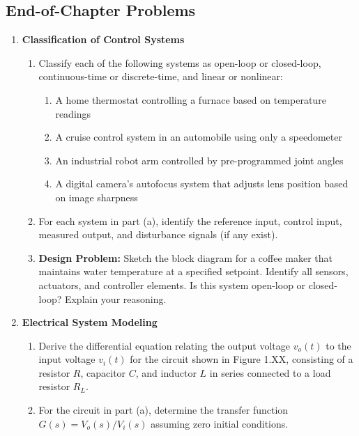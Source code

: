 \subsection{End-of-Chapter Problems}

\begin{enumerate}

\item \textbf{Classification of Control Systems}
\begin{enumerate}
\item Classify each of the following systems as open-loop or closed-loop, continuous-time or discrete-time, and linear or nonlinear:
\begin{enumerate}
\item A home thermostat controlling a furnace based on temperature readings
\item A cruise control system in an automobile using only a speedometer
\item An industrial robot arm controlled by pre-programmed joint angles
\item A digital camera's autofocus system that adjusts lens position based on image sharpness
\end{enumerate}
\item For each system in part (a), identify the reference input, control input, measured output, and disturbance signals (if any exist).

\item \textbf{Design Problem:} Sketch the block diagram for a coffee maker that maintains water temperature at a specified setpoint. Identify all sensors, actuators, and controller elements. Is this system open-loop or closed-loop? Explain your reasoning.

\end{enumerate}

\item \textbf{Electrical System Modeling}
\begin{enumerate}
\item Derive the differential equation relating the output voltage $v_o(t)$ to the input voltage $v_i(t)$ for the circuit shown in Figure 1.XX, consisting of a resistor $R$, capacitor $C$, and inductor $L$ in series connected to a load resistor $R_L$.

\item For the circuit in part (a), determine the transfer function $G(s) = V_o(s)/V_i(s)$ assuming zero initial conditions.


\end{enumerate}
\end{enumerate}
